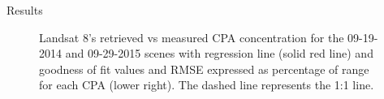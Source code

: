 \documentclass{beamer}
\begin{document}
\begin{frame}{}
\begin{columns}[t]
\begin{column}{.31\linewidth}
\begin{block}{Results}
\begin{figure}[htb]
  \caption{Landsat 8's retrieved vs measured CPA concentration for the 09-19-2014 and 09-29-2015 scenes with regression line (solid red line) and goodness of fit values and RMSE expressed as percentage of range for each CPA (lower right). The dashed line represents the 1:1 line. \label{fig:CPAsRetVSMea} } 
\end{figure}        


\end{block}  


	


   
% 				
% 				

\end{column}
\end{columns}
\end{frame}
\end{document}
